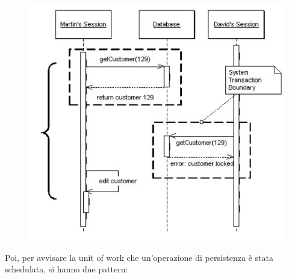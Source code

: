\documentclass[a4paper,12pt, oneside]{book}
\begin{document}
\begin{itemize}
\begin{figure}[H]
    \includegraphics[scale = 0.4]{img/pl.jpg}
  \end{figure}
\end{itemize}
Poi, per avvisare la unit of work che un'operazione di persistenza è stata
schedulata, si hanno due pattern:
\end{document}
